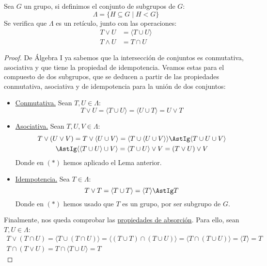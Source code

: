 \begin{prop}
    Sea $G$ un grupo, si definimos el conjunto de subgrupos de $G$:
    \begin{equation*}
        \Lambda = \{H \subseteq G \mid H < G\}
    \end{equation*}
    Se verifica que $\Lambda$ es un retículo, junto con las operaciones:
    \begin{align*}
        T \lor U &= \langle T\cup U \rangle  \\
        T \land U &= T\cap U
    \end{align*}
    \begin{proof}
        De Álgebra I ya sabemos que la intersección de conjuntos es conmutativa, asociativa y que tiene la propiedad de idempotencia. Veamos estas para el compuesto de dos subgrupos, que se deducen a partir de las propiedades conmutativa, asociativa y de idempotencia para la unión de dos conjuntos:
        \begin{itemize}
            \item \underline{Conmutativa.} Sean $T,U\in \Lambda$:
                \begin{equation*}
                    T\lor U = \langle T\cup U \rangle  = \langle U\cup T \rangle  = U\lor T
                \end{equation*}
            \item \underline{Asociativa.} Sean $T,U,V \in \Lambda$:
                \begin{multline*}
                    T\lor(U\lor V) = T\lor \langle U\cup V \rangle  = \langle T\cup \langle U\cup V \rangle  \rangle  \AstIg \langle T\cup U\cup V \rangle  \\ \AstIg \langle \langle T\cup U \rangle \cup V \rangle  = \langle T\cup U \rangle \lor V = (T\lor U)\lor V
                \end{multline*}
                Donde en $(\ast)$ hemos aplicado el Lema anterior.
            \item \underline{Idempotencia.} Sea $T\in \Lambda$:
                \begin{equation*}
                    T\lor T = \langle T\cup T \rangle  = \langle T \rangle  \AstIg T
                \end{equation*}
                Donde en $(\ast)$ hemos usado que $T$ es un grupo, por ser subgrupo de $G$.
        \end{itemize}
        Finalmente, nos queda comprobar las \underline{propiedades de absorción}. Para ello, sean $T,U\in \Lambda$:
        \begin{gather*}
            T\lor (T\cap U) = \langle T\cup (T\cap U) \rangle = \langle (T\cup T) \cap (T\cup U) \rangle  = \langle T\cap (T\cup U) \rangle = \langle T \rangle  = T \\
            T\cap (T\lor U) = T\cap \langle T\cup U \rangle = T
        \end{gather*}
    \end{proof}
\end{prop}

